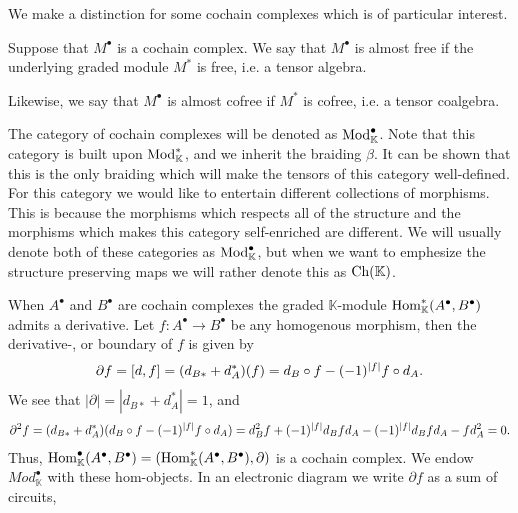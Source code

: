\documentclass[../thesis.tex]{subfiles}
\begin{document}
            We make a distinction for some cochain complexes which is of particular interest.
            
            \begin{definition}
                Suppose that $M^\bullet$ is a cochain complex. We say that $M^\bullet$ is almost free if the underlying graded module $M^*$ is free, i.e. a tensor algebra.

                Likewise, we say that $M^\bullet$ is almost cofree if $M^*$ is cofree, i.e. a tensor coalgebra.
            \end{definition}

            The category of cochain complexes will be denoted as $\tt{Mod}_\mathbb{K}^\bullet$. Note that this category is built upon $\tt{Mod}_\mathbb{K}^*$, and we inherit the braiding $\beta$. It can be shown that this is the only braiding which will make the tensors of this category well-defined. For this category we would like to entertain different collections of morphisms. This is because the morphisms which respects all of the structure and the morphisms which makes this category self-enriched are different. We will usually denote both of these categories as $\tt{Mod}_\mathbb{K}^\bullet$, but when we want to emphesize the structure preserving maps we will rather denote this as $\tt{Ch}(\mathbb{K})$.

            When $A^\bullet$ and $B^\bullet$ are cochain complexes the graded $\mathbb{K}$-module $\tt{Hom}_\mathbb{K}^*(A^\bullet, B^\bullet)$ admits a derivative. Let $f : A^\bullet \rightarrow B^\bullet$ be any homogenous morphism, then the derivative-, or boundary of $f$ is given by
            \begin{align*}
                \partial f = [d, f] = (d_{B*} + d_A^*)(f) = d_B \circ f - (-1)^{|f|}f\circ d_A\tt{.}
            \end{align*}
            We see that $|\partial| = |d_{B*} + d_A^*| = 1$, and
            \begin{align*}
                \partial^2f = (d_{B*} + d_A^*)(d_B \circ f - (-1)^{|f|}f\circ d_A) = d_B^2f + (-1)^{|f|}d_Bfd_A - (-1)^{|f|}d_Bfd_A - fd_A^2 = 0\tt{.}
            \end{align*}
            Thus, $\tt{Hom}_\mathbb{K}^\bullet(A^\bullet, B^\bullet) = (\tt{Hom}_\mathbb{K}^*(A^\bullet, B^\bullet), \partial)$ is a cochain complex. We endow $Mod_\mathbb{K}^\bullet$ with these hom-objects. In an electronic diagram we write $\partial f$ as a sum of circuits,
            
\end{document}
